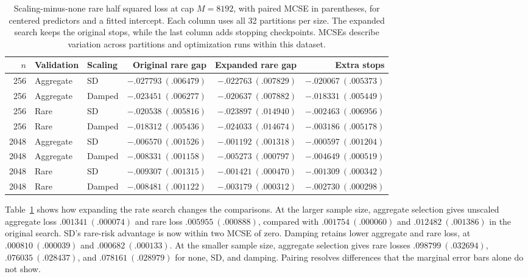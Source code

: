 \begin{table}[ht]
 \centering
 \small
 \begin{tabular}{rllrrr}
  \toprule
   $n$ & Validation & Scaling &     Original rare gap &     Expanded rare gap &           Extra stops \\
  \midrule
   256 & Aggregate  & SD      & $-.027793\ (.006479)$ & $-.022763\ (.007829)$ & $-.020067\ (.005373)$ \\
   256 & Aggregate  & Damped  & $-.023451\ (.006277)$ & $-.020637\ (.007882)$ & $-.018331\ (.005449)$ \\
   256 & Rare       & SD      & $-.020538\ (.005816)$ & $-.023897\ (.014940)$ & $-.002463\ (.006956)$ \\
   256 & Rare       & Damped  & $-.018312\ (.005436)$ & $-.024033\ (.014674)$ & $-.003186\ (.005178)$ \\
  2048 & Aggregate  & SD      & $-.006570\ (.001526)$ & $-.001192\ (.001318)$ & $-.000597\ (.001204)$ \\
  2048 & Aggregate  & Damped  & $-.008331\ (.001158)$ & $-.005273\ (.000797)$ & $-.004649\ (.000519)$ \\
  2048 & Rare       & SD      & $-.009307\ (.001315)$ & $-.001421\ (.000470)$ & $-.001309\ (.000342)$ \\
  2048 & Rare       & Damped  & $-.008481\ (.001122)$ & $-.003179\ (.000312)$ & $-.002730\ (.000298)$ \\
  \bottomrule
 \end{tabular}
 \caption{
  Scaling-minus-none rare half squared loss at cap $M = 8192$, with paired MCSE
  in parentheses, for centered predictors and a fitted intercept. Each column
  uses all 32 partitions per size. The expanded search keeps the original
  stops, while the last column adds stopping checkpoints. MCSEs describe
  variation across partitions and optimization runs within this dataset.
 }
 \label{tab:mushroom-expanded-gaps}
\end{table}

Table~\ref{tab:mushroom-expanded-gaps} shows how expanding the rate search
changes the comparisons. At the larger sample size, aggregate selection gives
unscaled aggregate loss $.001341\ (.000074)$ and rare loss
$.005955\ (.000888)$, compared with $.001754\ (.000060)$ and
$.012482\ (.001386)$ in the original search. SD's rare-risk advantage is now
within two MCSE of zero. Damping retains lower aggregate and rare loss, at
$.000810\ (.000039)$ and $.000682\ (.000133)$. At the smaller sample size,
aggregate selection gives rare losses $.098799\ (.032694)$,
$.076035\ (.028437)$, and $.078161\ (.028979)$ for none, SD, and damping.
Pairing resolves differences that the marginal error bars alone do not show.

